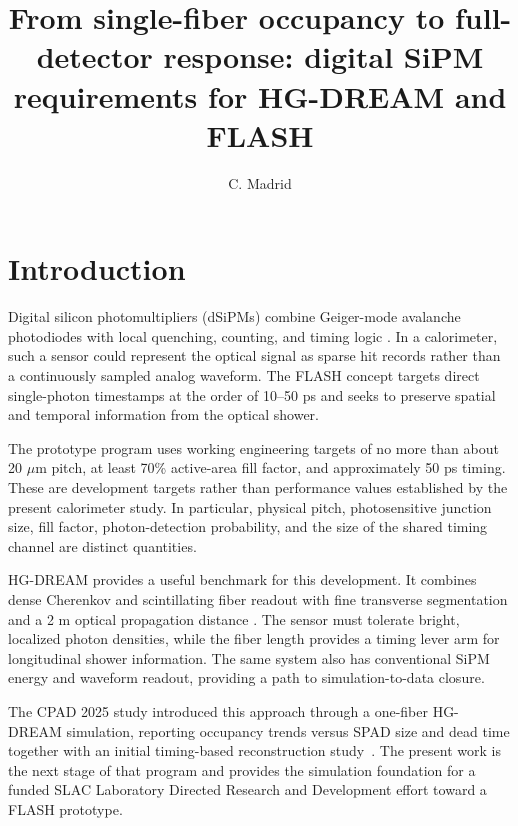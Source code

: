 \documentclass[a4paper,11pt]{article}
\title{\boldmath From single-fiber occupancy to full-detector response:
digital SiPM requirements for HG-DREAM and FLASH}
\author[a]{C. Madrid}
\affiliation[a]{Department of Physics and Astronomy, Texas Tech University,\\
Lubbock, Texas 79409, U.S.A.}
\begin{document}
\maketitle
\flushbottom

\section{Introduction}
\label{sec:introduction}

Digital silicon photomultipliers (dSiPMs) combine Geiger-mode avalanche
photodiodes with local quenching, counting, and timing logic
\cite{frach2009dsipm}. In a calorimeter, such a sensor could represent the
optical signal as sparse hit records rather than a continuously sampled analog
waveform. The FLASH concept targets direct single-photon timestamps at the
order of 10--50 ps and seeks to preserve spatial and temporal information from
the optical shower.

The prototype program uses working engineering targets of no more than about
20 $\mu$m pitch, at least 70\% active-area fill factor, and approximately
50 ps timing. These are development targets rather than performance values
established by the present calorimeter study. In particular, physical pitch,
photosensitive junction size, fill factor, photon-detection probability, and
the size of the shared timing channel are distinct quantities.

HG-DREAM provides a useful benchmark for this development. It combines dense
Cherenkov and scintillating fiber readout with fine transverse segmentation
and a 2 m optical propagation distance \cite{akchurin2025hgdream,feng2026hgdream}.
The sensor must tolerate bright, localized photon densities, while the fiber
length provides a timing lever arm for longitudinal shower information. The
same system also has conventional SiPM energy and waveform readout, providing
a path to simulation-to-data closure.

The CPAD 2025 study introduced this approach through a one-fiber HG-DREAM
simulation, reporting occupancy trends versus SPAD size and dead time together
with an initial timing-based reconstruction study~\cite{wu2025cpad}. The
present work is the next stage of that program and provides the simulation
foundation for a funded SLAC Laboratory Directed Research and Development
effort toward a FLASH prototype.
\end{document}
